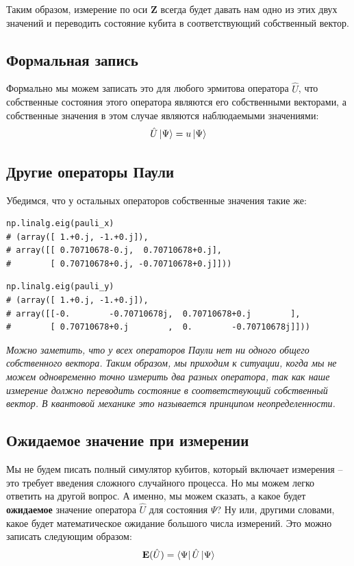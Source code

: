 \documentclass[11pt]{article}
\begin{document}
Таким образом, измерение по оси \(\mathbf{Z}\) всегда будет давать нам одно из этих двух значений и переводить состояние кубита в соответствующий собственный вектор.

\subsection{Формальная запись}
\label{sec:orga4744bb}
Формально мы можем записать это для любого эрмитова оператора \(\hat{U}\), что собственные состояния этого оператора являются его собственными векторами, а собственные значения в этом случае являются наблюдаемыми значениями:
\begin{align*}
\hat{U}\ket{\Psi} = u\ket{\Psi}
\end{align*}

\subsection{Другие операторы Паули}
\label{sec:org2fde0d9}
Убедимся, что у остальных операторов собственные значения такие же:


\begin{verbatim}
np.linalg.eig(pauli_x)
# (array([ 1.+0.j, -1.+0.j]),
# array([[ 0.70710678-0.j,  0.70710678+0.j],
#        [ 0.70710678+0.j, -0.70710678+0.j]]))
\end{verbatim}

\begin{verbatim}
np.linalg.eig(pauli_y)
# (array([ 1.+0.j, -1.+0.j]),
# array([[-0.        -0.70710678j,  0.70710678+0.j        ],
#        [ 0.70710678+0.j        ,  0.        -0.70710678j]]))
\end{verbatim}



\textit{
Можно заметить, что у всех операторов Паули нет ни одного общего собственного вектора. Таким образом, мы приходим к ситуации, когда мы не можем одновременно точно измерить два разных оператора, так как наше измерение должно переводить состояние в соответствующий собственный вектор. В квантовой механике это называется принципом неопределенности.}

\subsection{Ожидаемое значение при измерении}
\label{sec:orgffac7de}
Мы не будем писать полный симулятор кубитов, который включает измерения -- это требует введения сложного случайного процесса. Но мы можем легко ответить на другой вопрос. А именно, мы можем сказать, а какое будет \textbf{ожидаемое} значение оператора \(\hat{U}\) для состояния \(\Psi\)? Ну или, другими словами, какое будет математическое ожидание большого числа измерений. Это можно записать следующим образом:
\begin{align*}
\mathbf{E}(\hat{U}) = \bra{\Psi}\hat{U}\ket{\Psi}
\end{align*}
\end{document}
